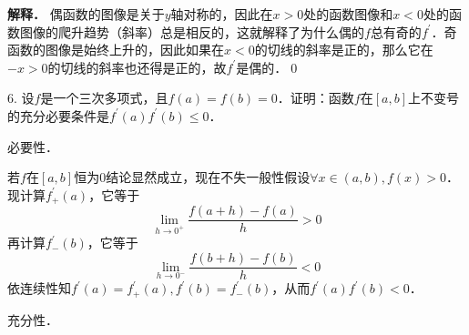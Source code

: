 \textbf{解释．} 偶函数的图像是关于$y$轴对称的，因此在$x > 0$处的函数图像和$x<0$处的函数图像的爬升趋势（斜率）总是相反的，这就解释了为什么偶的$f$总有奇的$f^{\prime}$．奇函数的图像是始终上升的，因此如果在$x < 0$的切线的斜率是正的，那么它在$-x > 0$的切线的斜率也还得是正的，故$f^{\prime}$是偶的．\qed\bigskip

6. 设$f$是一个三次多项式，且$f(a)=f(b)=0$．证明：函数$f$在$[a,b]$上不变号的充分必要条件是$f^{\prime}(a)f^{\prime}(b)\leq 0$．

\prove 

必要性．

若$f$在$[a,b]$恒为$0$结论显然成立，现在不失一般性假设$\forall x \in (a,b), f(x) > 0$．现计算$f^{\prime}_{+}(a)$，它等于
\begin{equation}
    \lim_{h \to 0^+} \frac{f(a+h)-f(a)}{h} > 0
\end{equation}
再计算$f^{\prime}_{-}(b)$，它等于
\begin{equation}
    \lim_{h \to 0^-} \frac{f(b+h)-f(b)}{h} < 0
\end{equation}
依连续性知$f^{\prime}(a)=f^{\prime}_{+}(a), f^{\prime}(b)=f^{\prime}_{-}(b)$，从而$f^{\prime}(a)f^{\prime}(b) < 0$．

充分性．